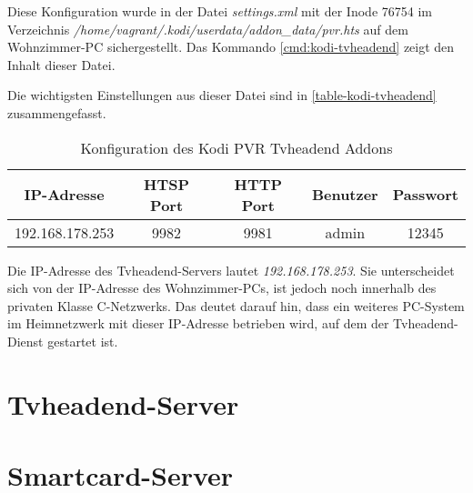 Diese Konfiguration wurde in der Datei \textit{settings.xml} mit der Inode 76754 im Verzeichnis \textit{/home/vagrant/.kodi/userdata/addon\_data/pvr.hts} auf dem Wohnzimmer-PC sichergestellt. Das Kommando \autoref{cmd:kodi-tvheadend} zeigt den Inhalt dieser Datei.

Die wichtigsten Einstellungen aus dieser Datei sind in \autoref{table-kodi-tvheadend} zusammengefasst.

\begin{table}[H]
\centering
\begin{tabular}{ccccc}
\hline 
IP-Adresse & HTSP Port & HTTP Port & Benutzer & Passwort \\ 
\hline 
192.168.178.253 & 9982 & 9981 & admin & 12345 \\ 
\hline 
\end{tabular}
\caption{Konfiguration des Kodi PVR Tvheadend Addons}
\label{table-kodi-tvheadend}
\end{table}

Die IP-Adresse des Tvheadend-Servers lautet \textit{192.168.178.253}. Sie unterscheidet sich von der IP-Adresse des Wohnzimmer-PCs, ist jedoch noch innerhalb des privaten Klasse C-Netzwerks. Das deutet darauf hin, dass ein weiteres PC-System im Heimnetzwerk mit dieser IP-Adresse betrieben wird, auf dem der Tvheadend-Dienst gestartet ist.

\section{Tvheadend-Server}

\section{Smartcard-Server}
